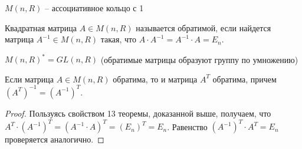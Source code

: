 \begin{follow}
    $M(n, R)$ -- ассоциативное кольцо с 1
\end{follow}

\vspace{7mm}

\begin{conj}
    Квадратная матрица $A \in M(n, R)$ называется обратимой, если найдется матрица $A^{-1} \in M(n, R)$ такая, что $A \cdot A^{-1} = A^{-1} \cdot A = E_n$.
\end{conj}

\begin{notice}
    $M(n, R)^* = GL(n, R)$ (обратимые матрицы образуют группу по умножению)
\end{notice}

\vspace{7mm}

\begin{theorem-non}
    Если матрица $A \in M(n, R)$ обратима, то и матрица $A^T$ обратима, причем $(A^T)^{-1} = (A^{-1})^T$.
\end{theorem-non}

\begin{proof}
    Пользуясь свойством 13 теоремы, доказанной выше, получаем, что $A^T \cdot (A^{-1})^T = (A^{-1} \cdot A)^T = (E_n)^T = E_n$. 
    Равенство $(A^{-1})^T \cdot A^T = E_n$ проверяется аналогично.
\end{proof}